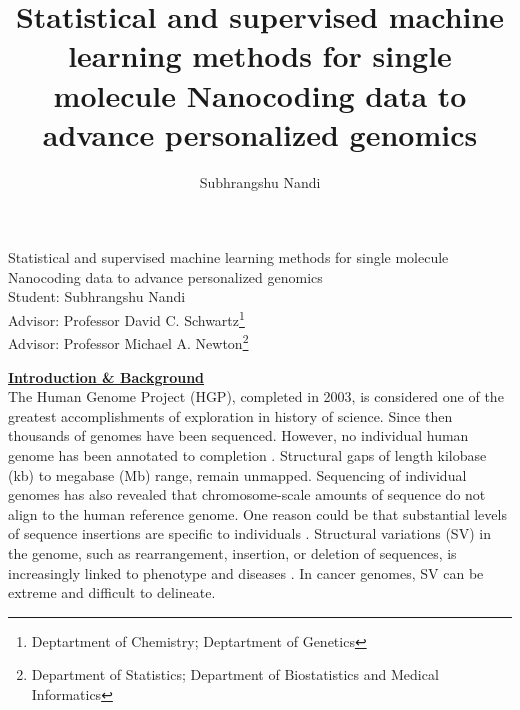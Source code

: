 \documentclass[12pt]{extarticle} %
\begin{document}

\title{Statistical and supervised machine learning methods for single molecule Nanocoding data to advance personalized genomics}
\author{Subhrangshu Nandi\\
\date{}
}
\begin{center} 
{\Large{Statistical and supervised machine learning methods for single molecule Nanocoding data to advance personalized genomics}} \\
Student: Subhrangshu Nandi \\
Advisor: Professor David C. Schwartz\footnote{Deptartment of Chemistry; Deptartment of Genetics}\\
Advisor: Professor Michael A. Newton\footnote{Department of Statistics; Department of Biostatistics and Medical Informatics}
\end{center}
\noindent
{\underline{\bf{Introduction \& Background}}}\\
The Human Genome Project (HGP), completed in 2003, is considered one of the greatest accomplishments of exploration in history of science. Since then thousands of genomes have been sequenced. However, no individual human genome has been annotated to completion \cite{10002010map}. Structural gaps of length kilobase (kb) to megabase (Mb) range, remain unmapped. Sequencing of individual genomes has also revealed that chromosome-scale amounts of sequence do not align to the human reference genome. One reason could be that substantial levels of sequence insertions are specific to individuals \cite{Marie_etal_2013_PNAS}. Structural variations (SV) in the genome, such as rearrangement, insertion, or deletion of sequences, is increasingly linked to phenotype and diseases \cite{Hurles_etal_2008_TrendsInGenetics}. In cancer genomes, SV can be extreme \cite{Stephens_etal_2011_Cell} and difficult to delineate. 
\end{document}
